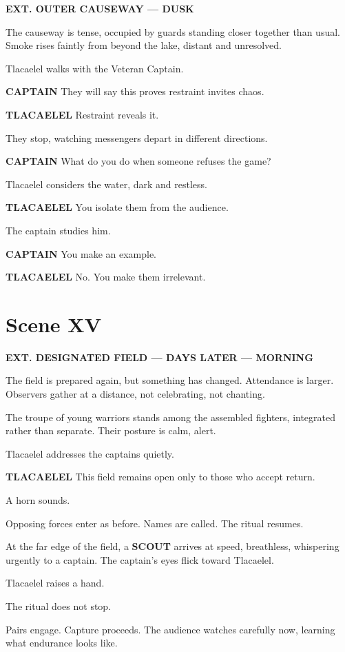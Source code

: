 \documentclass[12pt]{article}
\begin{document}
\textbf{EXT. OUTER CAUSEWAY --- DUSK}

The causeway is tense, occupied by guards standing closer together than usual. Smoke rises faintly from beyond the lake, distant and unresolved.

Tlacaelel walks with the Veteran Captain.

\textbf{CAPTAIN}  
They will say this proves restraint invites chaos.

\textbf{TLACAELEL}  
Restraint reveals it.

They stop, watching messengers depart in different directions.

\textbf{CAPTAIN}  
What do you do when someone refuses the game?

Tlacaelel considers the water, dark and restless.

\textbf{TLACAELEL}  
You isolate them from the audience.

The captain studies him.

\textbf{CAPTAIN}  
You make an example.

\textbf{TLACAELEL}  
No.  
You make them irrelevant.

\section*{Scene XV}

\textbf{EXT. DESIGNATED FIELD --- DAYS LATER --- MORNING}

The field is prepared again, but something has changed. Attendance is larger. Observers gather at a distance, not celebrating, not chanting.

The troupe of young warriors stands among the assembled fighters, integrated rather than separate. Their posture is calm, alert.

Tlacaelel addresses the captains quietly.

\textbf{TLACAELEL}  
This field remains open only to those who accept return.

A horn sounds.

Opposing forces enter as before. Names are called. The ritual resumes.

At the far edge of the field, a \textbf{SCOUT} arrives at speed, breathless, whispering urgently to a captain. The captain’s eyes flick toward Tlacaelel.

Tlacaelel raises a hand.

The ritual does not stop.

Pairs engage. Capture proceeds. The audience watches carefully now, learning what endurance looks like.
\end{document}
